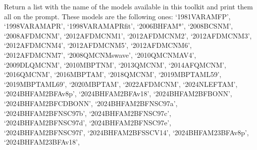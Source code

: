 \documentclass[letterpaper,10pt,english]{sphinxmanual}
\begin{document}

\begin{fulllineitems}
\label{\detokenize{source/api/setup_micro_matter:nucleardatapy.setup_micro_matter.models_micro_matter}}
\pysigstartsignatures
\pysiglinewithargsret
{}
{}
{}
\pysigstopsignatures
\sphinxAtStartPar
Return a list with the name of the models available in this toolkit and     print them all on the prompt. These models are the following ones:     ‘1981\sphinxhyphen{}VAR\sphinxhyphen{}AM\sphinxhyphen{}FP’, ‘1998\sphinxhyphen{}VAR\sphinxhyphen{}AM\sphinxhyphen{}APR’, ‘1998\sphinxhyphen{}VAR\sphinxhyphen{}AM\sphinxhyphen{}APRfit’, ‘2006\sphinxhyphen{}BHF\sphinxhyphen{}AM*’, ‘2008\sphinxhyphen{}BCS\sphinxhyphen{}NM’, ‘2008\sphinxhyphen{}AFDMC\sphinxhyphen{}NM’,     ‘2012\sphinxhyphen{}AFDMC\sphinxhyphen{}NM\sphinxhyphen{}1’, ‘2012\sphinxhyphen{}AFDMC\sphinxhyphen{}NM\sphinxhyphen{}2’, ‘2012\sphinxhyphen{}AFDMC\sphinxhyphen{}NM\sphinxhyphen{}3’, ‘2012\sphinxhyphen{}AFDMC\sphinxhyphen{}NM\sphinxhyphen{}4’,     ‘2012\sphinxhyphen{}AFDMC\sphinxhyphen{}NM\sphinxhyphen{}5’, ‘2012\sphinxhyphen{}AFDMC\sphinxhyphen{}NM\sphinxhyphen{}6’, ‘2012\sphinxhyphen{}AFDMC\sphinxhyphen{}NM\sphinxhyphen{}7’,     ‘2008\sphinxhyphen{}QMC\sphinxhyphen{}NM\sphinxhyphen{}swave’, ‘2010\sphinxhyphen{}QMC\sphinxhyphen{}NM\sphinxhyphen{}AV4’, ‘2009\sphinxhyphen{}DLQMC\sphinxhyphen{}NM’, ‘2010\sphinxhyphen{}MBPT\sphinxhyphen{}NM’,     ‘2013\sphinxhyphen{}QMC\sphinxhyphen{}NM’, ‘2014\sphinxhyphen{}AFQMC\sphinxhyphen{}NM’, ‘2016\sphinxhyphen{}QMC\sphinxhyphen{}NM’, ‘2016\sphinxhyphen{}MBPT\sphinxhyphen{}AM’,     ‘2018\sphinxhyphen{}QMC\sphinxhyphen{}NM’, ‘2019\sphinxhyphen{}MBPT\sphinxhyphen{}AM\sphinxhyphen{}L59’, ‘2019\sphinxhyphen{}MBPT\sphinxhyphen{}AM\sphinxhyphen{}L69’,     ‘2020\sphinxhyphen{}MBPT\sphinxhyphen{}AM’, ‘2022\sphinxhyphen{}AFDMC\sphinxhyphen{}NM’, ‘2024\sphinxhyphen{}NLEFT\sphinxhyphen{}AM’,     ‘2024\sphinxhyphen{}BHF\sphinxhyphen{}AM\sphinxhyphen{}2BF\sphinxhyphen{}Av8p’, ‘2024\sphinxhyphen{}BHF\sphinxhyphen{}AM\sphinxhyphen{}2BF\sphinxhyphen{}Av18’, ‘2024\sphinxhyphen{}BHF\sphinxhyphen{}AM\sphinxhyphen{}2BF\sphinxhyphen{}BONN’, ‘2024\sphinxhyphen{}BHF\sphinxhyphen{}AM\sphinxhyphen{}2BF\sphinxhyphen{}CDBONN’,     ‘2024\sphinxhyphen{}BHF\sphinxhyphen{}AM\sphinxhyphen{}2BF\sphinxhyphen{}NSC97a’, ‘2024\sphinxhyphen{}BHF\sphinxhyphen{}AM\sphinxhyphen{}2BF\sphinxhyphen{}NSC97b’, ‘2024\sphinxhyphen{}BHF\sphinxhyphen{}AM\sphinxhyphen{}2BF\sphinxhyphen{}NSC97c’, ‘2024\sphinxhyphen{}BHF\sphinxhyphen{}AM\sphinxhyphen{}2BF\sphinxhyphen{}NSC97d’,     ‘2024\sphinxhyphen{}BHF\sphinxhyphen{}AM\sphinxhyphen{}2BF\sphinxhyphen{}NSC97e’, ‘2024\sphinxhyphen{}BHF\sphinxhyphen{}AM\sphinxhyphen{}2BF\sphinxhyphen{}NSC97f’, ‘2024\sphinxhyphen{}BHF\sphinxhyphen{}AM\sphinxhyphen{}2BF\sphinxhyphen{}SSCV14’,    ‘2024\sphinxhyphen{}BHF\sphinxhyphen{}AM\sphinxhyphen{}23BF\sphinxhyphen{}Av8p’, ‘2024\sphinxhyphen{}BHF\sphinxhyphen{}AM\sphinxhyphen{}23BF\sphinxhyphen{}Av18’, 
\end{fulllineitems}
\end{document}
